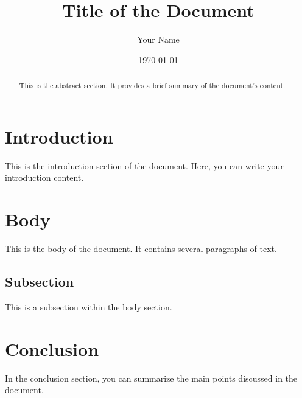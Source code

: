 \documentclass{article}
\title{Title of the Document}
\author{Your Name}
\date{\today}
\begin{document}
\maketitle

\begin{abstract}
This is the abstract section. It provides a brief summary of the document's content.
\end{abstract}

\section{Introduction}
This is the introduction section of the document. Here, you can write your introduction content.

\section{Body}
This is the body of the document. It contains several paragraphs of text.

\subsection{Subsection}
This is a subsection within the body section.

\section{Conclusion}
In the conclusion section, you can summarize the main points discussed in the document.
\end{document}
